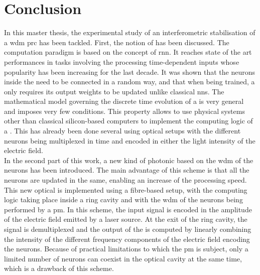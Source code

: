 \chapter{Conclusion}

In this master thesis, the experimental study of an interferometric stabilisation of a \gls{wdm} \gls{prc} has been tackled. First, the notion of \rc has been discussed. The \rc computation paradigm is based on the concept of \gls{rnn}. It reaches state of the art performances in tasks involving the processing time-dependent inputs whose popularity has been increasing for the last decade. It was shown that the neurons inside the \rcer need to be connected in a random way, and that when being trained, a \rcer only requires its output weights to be updated unlike classical \glspl{nn}. The mathematical model governing the discrete time evolution of a \rcer is very general and imposes very few conditions. This property allows to use physical systems other than classical silicon-based computers to implement the computing logic of a \rcer. This has already been done several using optical setups with the different neurons being multiplexed in time and encoded in either the light intensity of the electric field.\\

In the second part of this work, a new kind of photonic \rcer based on the \gls{wdm} of the neurons has been introduced. The main advantage of this scheme is that all the neurons are updated in the same, enabling an increase of the processing speed. This new optical \rcer is implemented using a fibre-based setup, with the \rc computing logic taking place inside a ring cavity and with the \gls{wdm} of the neurons being performed by a \gls{pm}. In this scheme, the input signal is encoded in the amplitude of the electric field emitted by a laser source. At the exit of the ring cavity, the signal is demultiplexed and the output of the \rcer is computed by linearly combining the intensity of the different frequency components of the electric field encoding the neurons. Because of practical limitations to which the \gls{pm} is subject, only a limited number of neurons can coexist in the optical cavity at the same time, which is a drawback of this scheme. \\

